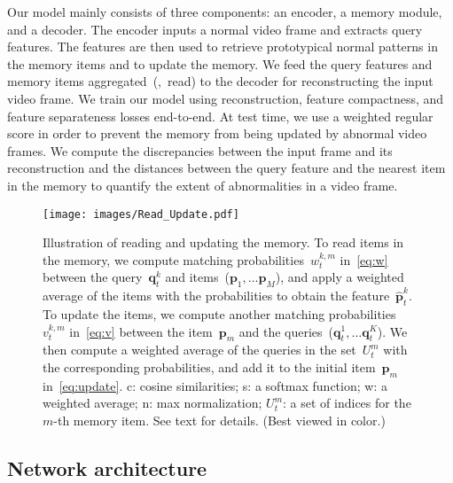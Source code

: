 \documentclass[10pt,twocolumn,letterpaper]{article}
\begin{document}
Our model mainly consists of three components: an encoder, a memory module, and a decoder. The encoder inputs a normal video frame and extracts query features. The features are then used to retrieve prototypical normal patterns in the memory items and to update the memory. We feed the query features and memory items aggregated~(\ie,~read) to the decoder for reconstructing the input video frame. We train our model using reconstruction, feature compactness, and feature separateness losses end-to-end. At test time, we use a weighted regular score in order to prevent the memory from being updated by abnormal video frames. We compute the discrepancies between the input frame and its reconstruction and the distances between the query feature and the nearest item in the memory to quantify the extent of abnormalities in a video frame.


    
 	\begin{figure}[t]
		\centering
			\texttt{[image: images/Read\_Update.pdf]}
\vspace{-0.2cm}
		\caption{Illustration of reading and updating the memory. To read items in the memory, we compute matching probabilities~$w_t^{k,m}$ in~\eqref{eq:w} between the query~$\mathbf{q}_t^k$ and items~($\mathbf{p}_1, \dots \mathbf{p}_M$), and apply a weighted average of the items with the probabilities to obtain the feature~$\hat{\mathbf{p}}_t^k$. To update the items, we compute another matching probabilities~$v_t^{k,m}$ in~\eqref{eq:v} between the item~$\mathbf{p}_m$ and the queries~($\mathbf{q}_t^1, \dots \mathbf{q}_t^K$). We then compute a weighted average of the queries in the set~$U_t^m$ with the corresponding probabilities, and add it to the initial item~$\mathbf{p}_m$ in~\eqref{eq:update}. c: cosine similarities; s: a softmax function; w: a weighted average; n: max normalization; $U_t^m$: a set of indices for the $m$-th memory item. See text for details. (Best viewed in color.)}
		\vspace{-0.3cm}
		\label{fig:memory}
    \end{figure}


    \vspace{-0.1cm}
	\subsection{Network architecture}\label{sec:network}
\vspace{-0.1cm}
\end{document}
